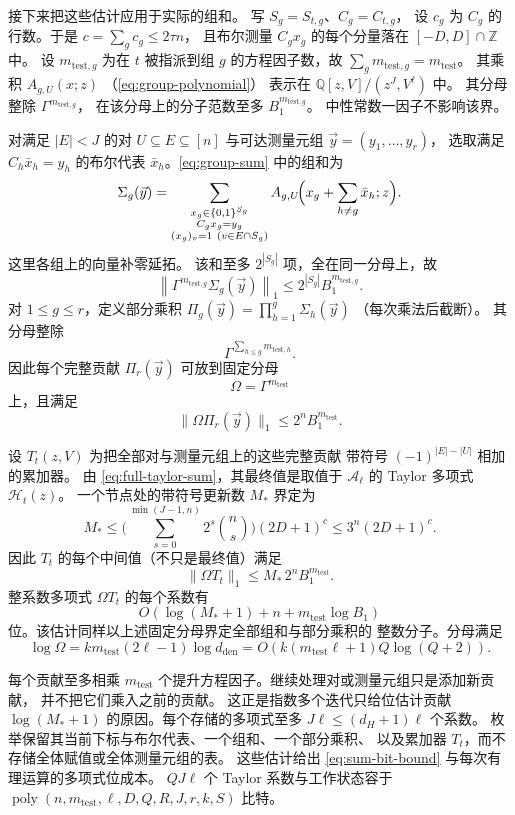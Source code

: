 \documentclass[11pt,reqno]{amsart}
\numberwithin{equation}{section}
\theoremstyle{definition}\newtheorem{definition}[theorem]{定义}
\theoremstyle{remark}\newtheorem{remark}[theorem]{注}
\newcommand{\poly}{\operatorname{poly}}
\renewcommand{\le}{\leqslant}
\begin{document}
接下来把这些估计应用于实际的组和。
写 $S_g=S_{t,g}$、$C_g=C_{t,g}$，
设 $c_g$ 为 $C_g$ 的行数。于是
$c=\sum_g c_g\le2\tau n$，
且布尔测量 $C_gx_g$ 的每个分量落在
$[-D,D]\cap\mathbb Z$ 中。
设 $m_{\mathrm{test},g}$ 为在 $t$ 被指派到组 $g$
的方程因子数，故
$\sum_g m_{\mathrm{test},g}=m_{\mathrm{test}}$。
其乘积 $A_{g,U}(x;z)$
（\eqref{eq:group-polynomial}）
表示在 $\mathbb Q[z,V]/(z^J,V^\ell)$ 中。
其分母整除 $\Gamma^{m_{\mathrm{test},g}}$，
在该分母上的分子范数至多
$B_1^{m_{\mathrm{test},g}}$。
中性常数一因子不影响该界。

对满足 $|E|<J$ 的对 $U\subseteq E\subseteq[n]$
与可达测量元组 $\vec y=(y_1,\ldots,y_r)$，
选取满足 $C_h\bar x_h=y_h$ 的布尔代表
$\bar x_h$。\eqref{eq:group-sum} 中的组和为
\[
 \Sigma_g(\vec y)=
 \sum_{\substack{x_g\in\{0,1\}^{S_g}\\ C_gx_g=y_g\\
                  (x_g)_v=1\ (v\in E\cap S_g)}}
 A_{g,U}\!\Bigl(x_g+\sum_{h\ne g}\bar x_h;z\Bigr).
\]
这里各组上的向量补零延拓。
该和至多 $2^{|S_g|}$ 项，全在同一分母上，故
\[
 \left\|\Gamma^{m_{\mathrm{test},g}}\Sigma_g(\vec y)\right\|_1
 \le 2^{|S_g|}B_1^{m_{\mathrm{test},g}}.
\]
对 $1\le g\le r$，定义部分乘积
$\Pi_g(\vec y)=\prod_{h=1}^g\Sigma_h(\vec y)$
（每次乘法后截断）。
其分母整除
\[
 \Gamma^{\sum_{h\le g}m_{\mathrm{test},h}}.
\]
因此每个完整贡献 $\Pi_r(\vec y)$
可放到固定分母
\[
 \Omega=\Gamma^{m_{\mathrm{test}}}
\]
上，且满足
\[
 \|\Omega\Pi_r(\vec y)\|_1
 \le2^nB_1^{m_{\mathrm{test}}}.
\]

设 $T_t(z,V)$ 为把全部对与测量元组上的这些完整贡献
带符号 $(-1)^{|E|-|U|}$ 相加的累加器。
由 \eqref{eq:full-taylor-sum}，其最终值是取值于
$\mathcal A_\ell$ 的 Taylor 多项式
$\mathcal H_t(z)$。
一个节点处的带符号更新数 $M_*$ 界定为
\[
 M_*\le
 \biggl(\sum_{s=0}^{\min(J-1,n)}2^s\binom ns\biggr)(2D+1)^c
 \le3^n(2D+1)^c.
\]
因此 $T_t$ 的每个中间值（不只是最终值）满足
\[
 \|\Omega T_t\|_1
 \le M_*\,2^nB_1^{m_{\mathrm{test}}}.
\]
整系数多项式 $\Omega T_t$ 的每个系数有
\[
 O\!\left(\log(M_*+1)+n+m_{\mathrm{test}}\log B_1\right)
\]
位。该估计同样以上述固定分母界定全部组和与部分乘积的
整数分子。分母满足
\[
 \log\Omega
 =k m_{\mathrm{test}}(2\ell-1)\log d_{\mathrm{den}}
 =O\!\left(k(m_{\mathrm{test}}\ell+1)Q\log(Q+2)\right).
\]

每个贡献至多相乘 $m_{\mathrm{test}}$
个提升方程因子。继续处理对或测量元组只是添加新贡献，
并不把它们乘入之前的贡献。
这正是指数多个迭代只给位估计贡献 $\log(M_*+1)$
的原因。每个存储的多项式至多
$J\ell\le(d_H+1)\ell$ 个系数。
枚举保留其当前下标与布尔代表、一个组和、一个部分乘积、
以及累加器 $T_t$，而不存储全体赋值或全体测量元组的表。
这些估计给出 \eqref{eq:sum-bit-bound}
与每次有理运算的多项式位成本。
$QJ\ell$ 个 Taylor 系数与工作状态容于
$\poly(n,m_{\mathrm{test}},\ell,D,Q,R,J,r,k,S)$
比特。
\end{document}
